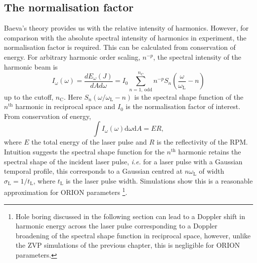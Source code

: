 \subsection{The normalisation factor}
Baeva's theory provides us with the relative intensity of harmonics. However, for comparison with the absolute spectral intensity of harmonics in experiment, the normalisation factor is required. This can be calculated from conservation of energy. For arbitrary harmonic order scaling, $n^{-p}$, the spectral intensity of the harmonic beam is
\begin{equation}
	I_\omega(\omega) = \frac{dE_\omega(J)}{dAd\omega} = I_0 \sum^{n_\mathrm{C}}_{n = 1,\ \mathrm{odd}} n^{-p} S_n\left( \frac{\omega}{\omega_\mathrm{L}}-n\right)
\end{equation}
up to the cutoff, $n_\mathrm{C}$. Here $S_n(\omega/\omega_\mathrm{L}-n)$ is the spectral shape function of the $n^\mathrm{th}$ harmonic in reciprocal space and $I_0$ is the normalisation factor of interest. From conservation of energy,
\begin{equation}
	\int I_\omega(\omega) \mathrm{d}\omega \mathrm{d} A = ER,
\end{equation}
where $E$ the total energy of the laser pulse and $R$ is the reflectivity of the \ac{RPM}. Intuition suggests the spectral shape function for the $n^\mathrm{th}$ harmonic retains the spectral shape of the incident laser pulse, \textit{i.e.} for a laser pulse with a Gaussian temporal profile, this corresponds to a Gaussian centred at $n\omega_\mathrm{L}$ of width $\sigma_\mathrm{L} = 1/t_\mathrm{L}$, where $t_\mathrm{L}$ is the laser pulse width. Simulations show this is a reasonable approximation for ORION parameters \footnote{Hole boring discussed in the following section can lead to a Doppler shift in harmonic energy across the laser pulse corresponding to a Doppler broadening of the spectral shape function in reciprocal space, however, unlike the ZVP simulations of the previous chapter, this is negligible for ORION parameters.}.

